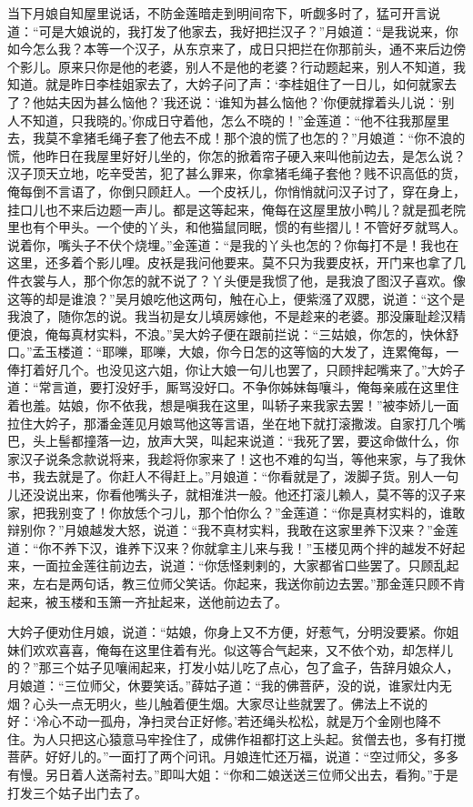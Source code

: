 当下月娘自知屋里说话，不防金莲暗走到明间帘下，听觑多时了，猛可开言说道：“可是大娘说的，我打发了他家去，我好把拦汉子？”月娘道：“是我说来，你如今怎么我？本等一个汉子，从东京来了，成日只把拦在你那前头，通不来后边傍个影儿。原来只你是他的老婆，别人不是他的老婆？行动题起来，别人不知道，我知道。就是昨日李桂姐家去了，大妗子问了声：‘李桂姐住了一日儿，如何就家去了？他姑夫因为甚么恼他？’我还说：‘谁知为甚么恼他？’你便就撑着头儿说：‘别人不知道，只我晓的。’你成日守着他，怎么不晓的！”金莲道：“他不往我那屋里去，我莫不拿猪毛绳子套了他去不成！那个浪的慌了也怎的？”月娘道：“你不浪的慌，他昨日在我屋里好好儿坐的，你怎的掀着帘子硬入来叫他前边去，是怎么说？汉子顶天立地，吃辛受苦，犯了甚么罪来，你拿猪毛绳子套他？贱不识高低的货，俺每倒不言语了，你倒只顾赶人。一个皮袄儿，你悄悄就问汉子讨了，穿在身上，挂口儿也不来后边题一声儿。都是这等起来，俺每在这屋里放小鸭儿？就是孤老院里也有个甲头。一个使的丫头，和他猫鼠同眠，惯的有些摺儿！不管好歹就骂人。说着你，嘴头子不伏个烧埋。”金莲道：“是我的丫头也怎的？你每打不是！我也在这里，还多着个影儿哩。皮袄是我问他要来。莫不只为我要皮袄，开门来也拿了几件衣裳与人，那个你怎的就不说了？丫头便是我惯了他，是我浪了图汉子喜欢。像这等的却是谁浪？”吴月娘吃他这两句，触在心上，便紫漒了双腮，说道：“这个是我浪了，随你怎的说。我当初是女儿填房嫁他，不是趁来的老婆。那没廉耻趁汉精便浪，俺每真材实料，不浪。”吴大妗子便在跟前拦说：“三姑娘，你怎的，快休舒口。”孟玉楼道：“耶嚛，耶嚛，大娘，你今日怎的这等恼的大发了，连累俺每，一俸打着好几个。也没见这六姐，你让大娘一句儿也罢了，只顾拌起嘴来了。”大妗子道：“常言道，要打没好手，厮骂没好口。不争你姊妹每嚷斗，俺每亲戚在这里住着也羞。姑娘，你不依我，想是嗔我在这里，叫轿子来我家去罢！”被李娇儿一面拉住大妗子，那潘金莲见月娘骂他这等言语，坐在地下就打滚撒泼。自家打几个嘴巴，头上髻都撞落一边，放声大哭，叫起来说道：“我死了罢，要这命做什么，你家汉子说条念款说将来，我趁将你家来了！这也不难的勾当，等他来家，与了我休书，我去就是了。你赶人不得赶上。”月娘道：“你看就是了，泼脚子货。别人一句儿还没说出来，你看他嘴头子，就相淮洪一般。他还打滚儿赖人，莫不等的汉子来家，把我别变了！你放恁个刁儿，那个怕你么？”金莲道：“你是真材实料的，谁敢辩别你？”月娘越发大怒，说道：“我不真材实料，我敢在这家里养下汉来？”金莲道：“你不养下汉，谁养下汉来？你就拿主儿来与我！”玉楼见两个拌的越发不好起来，一面拉金莲往前边去，说道：“你恁怪剌剌的，大家都省口些罢了。只顾乱起来，左右是两句话，教三位师父笑话。你起来，我送你前边去罢。”那金莲只顾不肯起来，被玉楼和玉箫一齐扯起来，送他前边去了。

大妗子便劝住月娘，说道：“姑娘，你身上又不方便，好惹气，分明没要紧。你姐妹们欢欢喜喜，俺每在这里住着有光。似这等合气起来，又不依个劝，却怎样儿的？”那三个姑子见嚷闹起来，打发小姑儿吃了点心，包了盒子，告辞月娘众人，月娘道：“三位师父，休要笑话。”薛姑子道：“我的佛菩萨，没的说，谁家灶内无烟？心头一点无明火，些儿触着便生烟。大家尽让些就罢了。佛法上不说的好：‘冷心不动一孤舟，净扫灵台正好修。’若还绳头松松，就是万个金刚也降不住。为人只把这心猿意马牢拴住了，成佛作祖都打这上头起。贫僧去也，多有打搅菩萨。好好儿的。”一面打了两个问讯。月娘连忙还万福，说道：“空过师父，多多有慢。另日着人送斋衬去。”即叫大姐：“你和二娘送送三位师父出去，看狗。”于是打发三个姑子出门去了。

